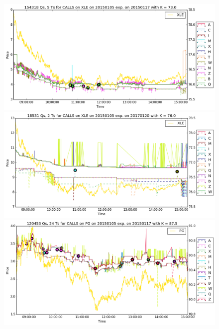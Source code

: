\documentclass[a4paper,12pt]{article}
\theoremstyle{plain}
\theoremstyle{definition}
\begin{document}
\vspace*{\fill}
\begin{figure}[H]
\begin{center}
 \includegraphics[width=\linewidth]{figures/contract_pics/XLE_top.png}
 \endminipage
 \hspace{3mm}
 \includegraphics[width=\linewidth]{figures/contract_pics/XLE_middle.png}
 \endminipage\\
  \vspace{5mm}
 \includegraphics[width=\linewidth]{figures/contract_pics/PG_top.png}
 \endminipage

\end{center}
\end{figure}
\end{document}
